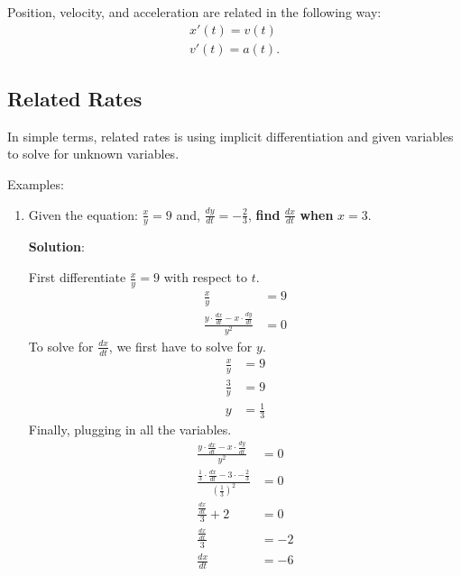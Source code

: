 \documentclass[12pt]{article}
\begin{document}
\noindent Position, velocity, and acceleration are related in the following way:
\begin{gather*}
    x'(t) = v(t) \\
    v'(t) = a(t).
\end{gather*}

\subsection{Related Rates}
In simple terms, related rates is using implicit differentiation and given variables to solve for unknown variables. %

\noindent Examples:
\begin{enumerate}
    \item Given the equation: $\frac{x}{y} = 9$ and, $\frac{dy}{dt} = -\frac{2}{3}$, \textbf{find} $\frac{dx}{dt}$ \textbf{when} $x=3$.

          \noindent \textbf{Solution}:

          \noindent First differentiate $\frac{x}{y} = 9$ with respect to $t$.
          \begin{align*}
              \frac{x}{y}                                               & = 9 \\[6pt]
              \frac{y \cdot \frac{dx}{dt} - x \cdot \frac{dy}{dt}}{y^2} & = 0
          \end{align*}
          To solve for $\frac{dx}{dt}$, we first have to solve for $y$.
          \begin{align*}
              \frac{x}{y} & = 9           \\[6pt]
              \frac{3}{y} & = 9           \\[6pt]
              y           & = \frac{1}{3}
          \end{align*}
          Finally, plugging in all the variables.
          \begin{align*}
              \frac{y \cdot \frac{dx}{dt} - x \cdot \frac{dy}{dt}}{y^2}                                   & = 0  \\[6pt]
              \frac{\frac{1}{3} \cdot \frac{dx}{dt} - 3 \cdot -\frac{2}{3}}{\left( \frac{1}{3} \right)^2} & = 0  \\[6pt]
              \frac{\frac{dx}{dt} }{3} + 2                                                                & = 0  \\[6pt]
              \frac{\frac{dx}{dt}}{3}                                                                     & = -2 \\[6pt]
              \frac{dx}{dt}                                                                               & = -6
          \end{align*}
          \smallskip


\end{enumerate}
\end{document}
